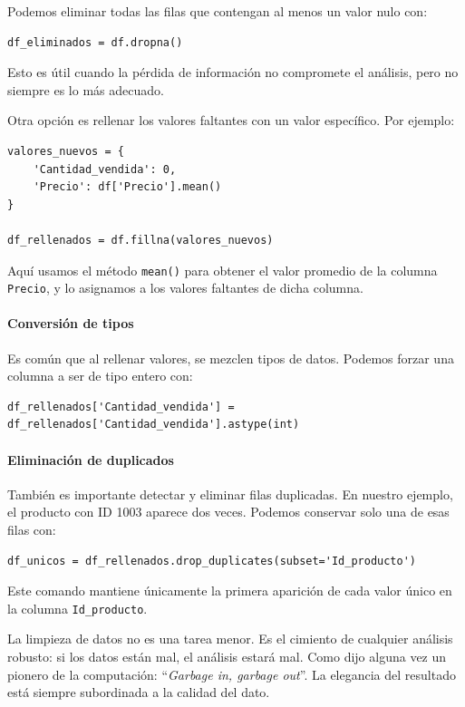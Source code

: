 \documentclass{article}
\theoremstyle{nonumberplain}
\begin{document}
Podemos eliminar todas las filas que contengan al menos un valor nulo con:

\begin{verbatim}
df_eliminados = df.dropna()
\end{verbatim}

Esto es útil cuando la pérdida de información no compromete el análisis, pero no siempre es lo más adecuado.

Otra opción es rellenar los valores faltantes con un valor específico. Por ejemplo:

\begin{verbatim}
valores_nuevos = {
    'Cantidad_vendida': 0,
    'Precio': df['Precio'].mean()
}

df_rellenados = df.fillna(valores_nuevos)
\end{verbatim}

Aquí usamos el método \texttt{mean()} para obtener el valor promedio de la columna \texttt{Precio}, y lo asignamos a los valores faltantes de dicha columna.

\paragraph{Conversión de tipos}

Es común que al rellenar valores, se mezclen tipos de datos. Podemos forzar una columna a ser de tipo entero con:

\begin{verbatim}
df_rellenados['Cantidad_vendida'] = df_rellenados['Cantidad_vendida'].astype(int)
\end{verbatim}

\paragraph{Eliminación de duplicados}

También es importante detectar y eliminar filas duplicadas. En nuestro ejemplo, el producto con ID 1003 aparece dos veces. Podemos conservar solo una de esas filas con:

\begin{verbatim}
df_unicos = df_rellenados.drop_duplicates(subset='Id_producto')
\end{verbatim}

Este comando mantiene únicamente la primera aparición de cada valor único en la columna \texttt{Id\_producto}.

La limpieza de datos no es una tarea menor. Es el cimiento de cualquier análisis robusto: si los datos están mal, el análisis estará mal. Como dijo alguna vez un pionero de la computación: “\textit{Garbage in, garbage out}”. La elegancia del resultado está siempre subordinada a la calidad del dato.
\end{document}
